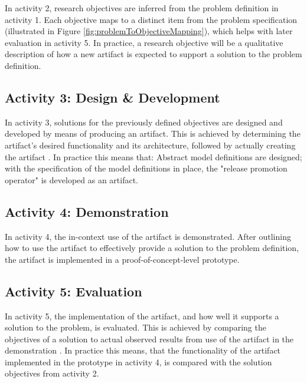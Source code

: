 \noindent
In activity 2,
research objectives are inferred from the problem definition in activity 1.
Each objective maps to a distinct item from the problem specification
(illustrated in Figure \ref{fig:problemToObjectiveMapping}),
which helps with later evaluation in activity 5.
In practice, a research objective will be a qualitative description of
how a new artifact is expected to support a solution to the problem definition.
\bigskip

\subsection{Activity 3: Design \& Development}
\label{methodology:activity3}

\noindent
In activity 3,
solutions for the previously defined objectives are designed and developed
by means of producing an artifact.
This is achieved by
determining the artifact's desired functionality and its architecture,
followed by actually creating the artifact
\autocite{designScienceResearchMethodologyForInformationSystemsResearch}.
In practice this means that:
Abstract model definitions are designed;
with the specification of the model definitions in place,
the "release promotion operator" is developed as an artifact.
\bigskip

\subsection{Activity 4: Demonstration}
\label{methodology:activity4}

\noindent
In activity 4,
the in-context use of the artifact is demonstrated.
After outlining how to use the artifact to effectively provide a solution to the problem definition,
the artifact is implemented in a proof-of-concept-level prototype.
\bigskip

\subsection{Activity 5: Evaluation}
\label{methodology:activity5}

\noindent
In activity 5,
the implementation of the artifact,
and how well it supports a solution to the problem,
is evaluated.
This is achieved by
comparing the objectives of a solution to actual observed results
from use of the artifact in the demonstration
\autocite{designScienceResearchMethodologyForInformationSystemsResearch}.
In practice this means, that
the functionality of the artifact implemented in the prototype in activity 4,
is compared with the solution objectives from activity 2.
\bigskip

